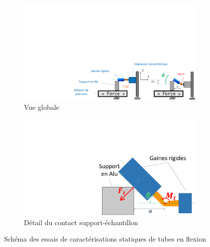 \begin{figure}[!htb]
	\begin{center}
		\begin{subfigure}[t]{0.69\textwidth}
			\captionsetup{justification=centering}
			\includegraphics[trim={9.8cm 0cm 0cm 11cm},clip,width=\textwidth]{../Chap4/Figure/essais_statique_VH.pdf}
			\caption{Vue globale}
			\label{fig:essais_statique_VH}
		\end{subfigure}
		\hfillx
		\begin{subfigure}[t]{0.29\textwidth}
			\captionsetup{justification=centering}
			\includegraphics[trim={14cm 0cm 0cm 7cm},clip,width=\textwidth]{../Chap4/Figure/essais_statique_detail.pdf}
			\caption{Détail du contact support-échantillon}
			\label{fig:essais_statique_detail}
		\end{subfigure}
		\caption{Schéma des essais de caractérisations statiques de tubes en flexion}
		\label{fig:essais_statique_total}
	\end{center}
\end{figure}
